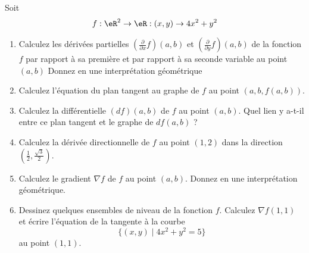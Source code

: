 
\begin{exercice}\label{exo0058}


Soit
\[
f : \eR^2 \rightarrow \eR: (x,y) \rightarrow 4x^2 + y^2
\]
\begin{enumerate}
\item
Calculez les dérivées partielles $(\frac{\partial}{\partial x}f)(a,b)$
et $(\frac{\partial}{\partial y}f)(a,b)$ de la fonction $f$ par rapport
à sa première et par rapport à sa seconde variable au point $(a,b)$
Donnez en une interprétation géométrique
\item
Calculez l'équation du plan tangent au graphe de $f$ au point
$(a,b,f(a,b))$.
\item
Calculez la différentielle $(df)(a,b)$ de $f$ au point $(a,b)$. Quel lien
y a-t-il entre ce plan tangent et le graphe de $df(a,b)$ ?
\item
Calculez la dérivée directionnelle de $f$ au point $(1,2)$ dans la
direction $(\frac{1}{2},\frac{\sqrt{3}}{2})$.
\item
Calculez le gradient $\nabla f$ de $f$ au point $(a,b)$. Donnez en une
interprétation géométrique.
\item Dessinez quelques ensembles de niveau de la fonction $f$. Calculez
$\nabla f(1,1)$ et écrire l'équation de la tangente \`a la courbe
\[
\{ (x,y) \mid 4x^2+y^2=5 \}
\]
au point $(1,1)$.
\end{enumerate}



\end{exercice}
